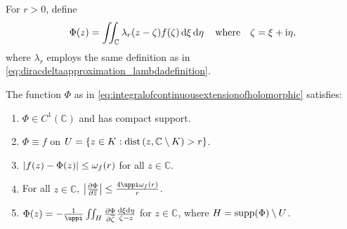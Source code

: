 For \(r>0\), define
\begin{equation}
    \Phi(z)=\iint_{\mathbb{C}}\lambda_r(z-\zeta)f(\zeta)\dd{\xi}\dd{\eta}\qq{where}\zeta=\xi+\ii\eta,\label{eq:integralofcontinuousextensionofholomorphic}
\end{equation}
where \(\lambda_r\) employs the same definition as in \cref{eq:diracdeltaapproximation_lambdadefinition}.
\begin{proposition}\label{prop:integralofcontinuousextensionofholomorphicproperties}
    The function \(\Phi\) as in \cref{eq:integralofcontinuousextensionofholomorphic} satisfies:
    \begin{enumerate}
        \item \(\Phi\in C^1(\mathbb{C})\) and has compact support.\label{itm:integralofcontinuousextensionofholomorphicproperties_continuousdifferentiabilitycompactsupport}
        \item \(\Phi\equiv f\) on \(U=\cbraces{z\in K}{\operatorname{dist}\qty(z,\mathbb{C}\setminus K)>r}\).\label{itm:integralofcontinuousextensionofholomorphicproperties_equivalenceonU}
        \item \(\abs{f(z)-\Phi(z)}\leq\omega_f(r)\) for all \(z\in\mathbb{C}\).\label{itm:integralofcontinuousextensionofholomorphicproperties_differbymodulusofcontinuity}
        \item For all \(z\in\mathbb{C}\), \(\abs{\pdv{\Phi}{\overline{z}}(z)}\leq\frac{4\uppi\omega_f(r)}{r}\).\label{itm:integralofcontinuousextensionofholomorphicproperties_antiholomorphicderivativebound}
        \item \(\Phi(z)=-\frac1\uppi\iint_H\pdv{\Phi}{\overline{\zeta}}(\zeta)\frac{\dd{\xi}\dd{\eta}}{\zeta-z}\) for \(z\in\mathbb{C}\), where \(H=\operatorname{supp}(\Phi)\setminus U\).\label{itm:integralofcontinuousextensionofholomorphicproperties_integralformula}
    \end{enumerate}
\end{proposition}

